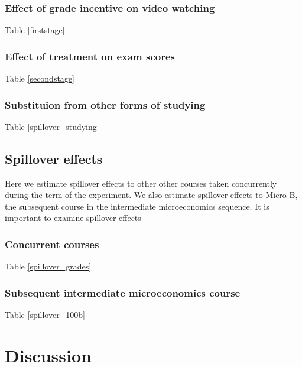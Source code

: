 \documentclass[12pt]{article}
\begin{document}
\subsubsection{Effect of grade incentive on video watching}

Table \ref{firststage}

\subsubsection{Effect of treatment on exam scores}

Table \ref{secondstage}

\subsubsection{Substituion from other forms of studying}

Table \ref{spillover_studying}

\subsection{Spillover effects}

Here we estimate spillover effects to other other courses taken concurrently during the term of the experiment. We also estimate spillover effects to Micro B, the subsequent course in the intermediate microeconomics sequence. It is important to examine spillover effects

\subsubsection{Concurrent courses}

Table \ref{spillover_grades}

\subsubsection{Subsequent intermediate microeconomics course}

Table \ref{spillover_100b}




\section{Discussion} \label{discussion}
\end{document}
